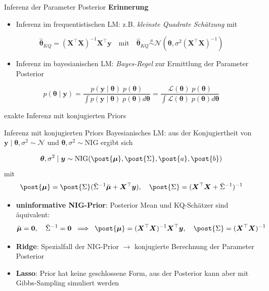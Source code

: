 \documentclass[
  ignorenonframetext,
  aspectratio=169,
]{beamer}
\providecommand{\tightlist}{%
  \setlength{\itemsep}{0pt}\setlength{\parskip}{0pt}}
\newcommand{\bnull}{\bm{0}}
\newcommand{\by}{\bm{y}}
\newcommand{\bX}{\bm{X}}
\newcommand{\Lcal}{\mathcal{L}}
\newcommand{\Ncal}{\mathcal{N}}
\newcommand{\ssd}{\sigma^2}
\newcommand{\btheta}{\bm{\theta}}
\newcommand{\hbtheta}{\hat{\bm{\theta}}}
\newcommand{\mupri}{\breve{\bm{\mu}}}
\newcommand{\mupo}{\post{\bm{\mu}}}
\newcommand{\Sdpo}{\post{\Sigma}}
\newcommand{\Sdipri}{\breve{\Sigma}^{-1}}
\newcommand{\apo}{\post{a}}
\newcommand{\bpo}{\post{b}}
\begin{document}
\begin{frame}{Inferenz der Parameter Posterior}
\protect{}\label{inferenz-der-parameter-posterior}
\textbf{Erinnerung}

\begin{itemize}
\tightlist
\item
  Inferenz im frequentistischen LM: z.B. \emph{kleinste Quadrate
  Schätzung} mit
\end{itemize}

\[
\hbtheta_{KQ} = (\bX^\top \bX)^{-1} \bX^\top \by \quad \text{mit} \quad \hbtheta_{KQ} \overset{a}{\sim} \Ncal(\btheta, \ssd (\bX^\top \bX)^{-1})
\]

\begin{itemize}
\tightlist
\item
  Inferenz im bayesianischen LM: \emph{Bayes-Regel} zur Ermittlung der
  Parameter Posterior
\end{itemize}

\[
p(\btheta \mid \by) = \frac{p(\by \mid \btheta) \; p(\btheta)}{\int p(\by \mid \btheta) \; p(\btheta) d \btheta}
= \frac{\Lcal(\btheta) \; p(\btheta)}{\int \Lcal(\btheta) \; p(\btheta) d \btheta}
\]
\end{frame}

\begin{frame}{exakte Inferenz mit konjugierten Priors}
\protect{}\label{exakte-inferenz-mit-konjugierten-priors}
\begin{block}{Inferenz mit konjugierten Priors}
\protect{}\label{inferenz-mit-konjugierten-priors}
Bayesianisches LM: aus der Konjugiertheit von
\(\by \mid \btheta, \ssd \sim \Ncal\) und
\(\btheta, \ssd \sim \text{NIG}\) ergibt sich

\[
\btheta, \ssd \mid \by \sim \text{NIG}(\mupo, \Sdpo, \apo, \bpo)
\] mit \[
\mupo = \Sdpo (\Sdipri \mupri + \bX^\top \by), \quad \Sdpo = (\bX^\top \bX + \Sdipri)^{-1}
\]
\end{block}

\begin{itemize}
\tightlist
\item
  \textbf{uninformative NIG-Prior}: Posterior Mean und KQ-Schätzer sind
  äquivalent: \[
  \mupri = \bnull, \quad \Sdipri = \bnull \; \implies \; \mupo = (\bX^\top \bX)^{-1} \bX^\top \by,\quad \Sdpo = (\bX^\top \bX)^{-1}
  \]
\end{itemize}

\begin{itemize}
\tightlist
\item
  \textbf{Ridge}: Spezialfall der NIG-Prior \(\to\) konjugierte
  Berechnung der Parameter Posterior
\item
  \textbf{Lasso}: Prior hat keine geschlossene Form, aus der Posterior
  kann aber mit Gibbs-Sampling simuliert werden
  \autocite{park_bayesian_2008}
\end{itemize}
\end{frame}
\end{document}

